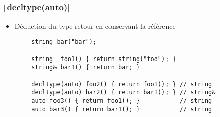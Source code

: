 \documentclass[C++.tex]{subfiles}
\begin{document}
\begin{frame}[fragile]
	\frametitle{\texttt|decltype(auto)|}
	\begin{itemize}
		\item Déduction du type retour en conservant la référence
	\end{itemize}

	\begin{verbatim}
		string bar("bar");

		string  foo1() { return string("foo"); }
		string& bar1() { return bar; }

		decltype(auto) foo2() { return foo1(); } // string
		decltype(auto) bar2() { return bar1(); } // string&
		auto foo3() { return foo1(); }           // string
		auto bar3() { return bar1(); }           // string
	\end{verbatim}
\end{frame}
\end{document}
